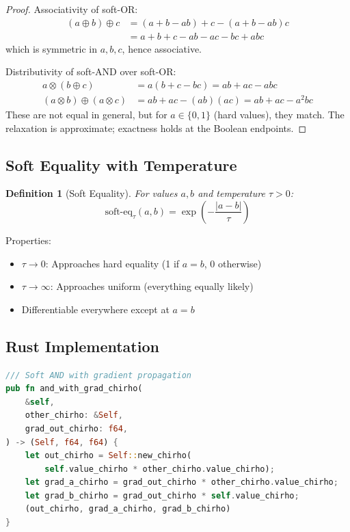 \documentclass[11pt,a4paper]{article}
\newtheorem{definition}[theorem]{Definition}
\begin{document}
\begin{proof}
Associativity of soft-OR:
\begin{align*}
(a \oplus b) \oplus c &= (a + b - ab) + c - (a + b - ab)c \\
&= a + b + c - ab - ac - bc + abc
\end{align*}
which is symmetric in $a, b, c$, hence associative.

Distributivity of soft-AND over soft-OR:
\begin{align*}
a \otimes (b \oplus c) &= a(b + c - bc) = ab + ac - abc \\
(a \otimes b) \oplus (a \otimes c) &= ab + ac - (ab)(ac) = ab + ac - a^2bc
\end{align*}
These are not equal in general, but for $a \in \{0, 1\}$ (hard values), they match.
The relaxation is approximate; exactness holds at the Boolean endpoints.
\end{proof}

\subsection{Soft Equality with Temperature}
\label{subsec:soft_eq_chirho}

\begin{definition}[Soft Equality]
\label{def:soft_eq_chirho}
For values $a, b$ and temperature $\tau > 0$:
\[
\text{soft-eq}_\tau(a, b) = \exp\left(-\frac{|a - b|}{\tau}\right)
\]
\end{definition}

Properties:
\begin{itemize}
  \item $\tau \to 0$: Approaches hard equality (1 if $a = b$, 0 otherwise)
  \item $\tau \to \infty$: Approaches uniform (everything equally likely)
  \item Differentiable everywhere except at $a = b$
\end{itemize}

\subsection{Rust Implementation}
\label{subsec:rust_impl_chirho}

\begin{lstlisting}[language=Rust,caption={Soft AND with gradient (diff\_semiring\_chirho.rs)}]
/// Soft AND with gradient propagation
pub fn and_with_grad_chirho(
    &self,
    other_chirho: &Self,
    grad_out_chirho: f64,
) -> (Self, f64, f64) {
    let out_chirho = Self::new_chirho(
        self.value_chirho * other_chirho.value_chirho);
    let grad_a_chirho = grad_out_chirho * other_chirho.value_chirho;
    let grad_b_chirho = grad_out_chirho * self.value_chirho;
    (out_chirho, grad_a_chirho, grad_b_chirho)
}
\end{lstlisting}
\end{document}
